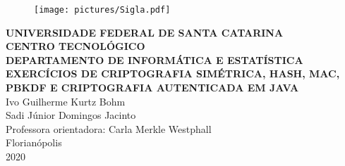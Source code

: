 \documentclass[12pt,a4paper]{article}
\begin{document}
	\singlespacing
	\begin{titlepage}
		\begin{center}
			\begin{figure}[!htb]
				\center
				\texttt{[image: pictures/Sigla.pdf]} 
			\end{figure}
			{\bf UNIVERSIDADE FEDERAL DE SANTA CATARINA}\\[0.2cm]
			{\bf CENTRO TECNOLÓGICO}\\[0.2cm]
			{\bf DEPARTAMENTO DE INFORMÁTICA E ESTATÍSTICA}\\[5.5cm]
			{\bf \large EXERCÍCIOS DE CRIPTOGRAFIA SIMÉTRICA, HASH, MAC, PBKDF E CRIPTOGRAFIA AUTENTICADA EM JAVA}\\[3.6 cm]
			{Ivo Guilherme Kurtz Bohm}\\	
			{Sadi Júnior Domingos Jacinto}\\[1cm]
			{Professora orientadora: Carla Merkle Westphall}\\[4.1 cm]
			{Florianópolis}\\[0.2cm]
			{2020}
		\end{center}
	\end{titlepage}
	
\end{document}
